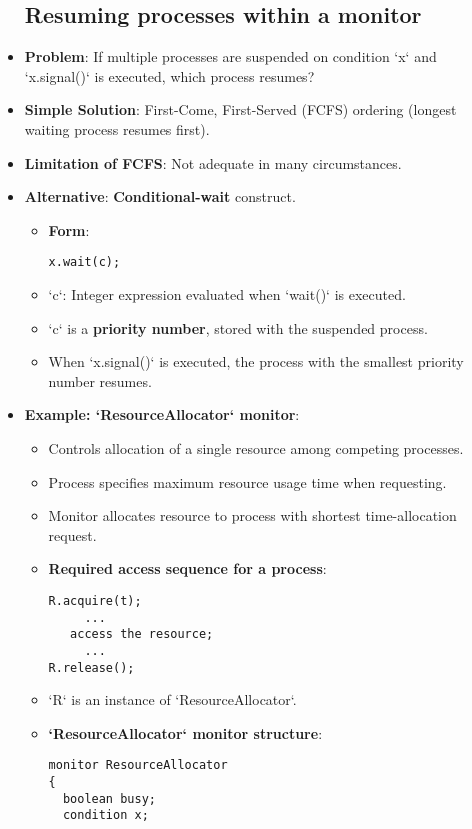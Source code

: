 \begin{itemize}
    \subsection{Resuming processes within a monitor}
    \item \textbf{Problem}: If multiple processes are suspended on condition `x` and `x.signal()` is executed, which process resumes?
    \item \textbf{Simple Solution}: First-Come, First-Served (FCFS) ordering (longest waiting process resumes first).
    \item \textbf{Limitation of FCFS}: Not adequate in many circumstances.
    \item \textbf{Alternative}: \textbf{Conditional-wait} construct.
    \begin{itemize}
        \item \textbf{Form}:
\begin{verbatim}
x.wait(c);
\end{verbatim}
        \item `c`: Integer expression evaluated when `wait()` is executed.
        \item `c` is a \textbf{priority number}, stored with the suspended process.
        \item When `x.signal()` is executed, the process with the smallest priority number resumes.
    \end{itemize}
    \item \textbf{Example: `ResourceAllocator` monitor}:
    \begin{itemize}
        \item Controls allocation of a single resource among competing processes.
        \item Process specifies maximum resource usage time when requesting.
        \item Monitor allocates resource to process with shortest time-allocation request.
        \item \textbf{Required access sequence for a process}:
\begin{verbatim}
R.acquire(t);
     ...
   access the resource;
     ...
R.release();
\end{verbatim}
        \item `R` is an instance of `ResourceAllocator`.
        \item \textbf{`ResourceAllocator` monitor structure}:
\begin{verbatim}
monitor ResourceAllocator
{
  boolean busy;
  condition x;
 

\end{verbatim}
\end{itemize}
\end{itemize}
